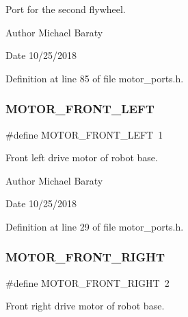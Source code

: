 Port for the second flywheel. 

\begin{DoxyAuthor}{Author}
Michael Baraty 
\end{DoxyAuthor}
\begin{DoxyDate}{Date}
10/25/2018 
\end{DoxyDate}


Definition at line 85 of file motor\+\_\+ports.\+h.

\mbox{\label{motor__ports_8h_a743b47e164fb23b30f4f2f228db0b338}} 
\subsubsection{M\+O\+T\+O\+R\+\_\+\+F\+R\+O\+N\+T\+\_\+\+L\+E\+FT}
{\footnotesize\ttfamily \#define M\+O\+T\+O\+R\+\_\+\+F\+R\+O\+N\+T\+\_\+\+L\+E\+FT~1}



Front left drive motor of robot base. 

\begin{DoxyAuthor}{Author}
Michael Baraty 
\end{DoxyAuthor}
\begin{DoxyDate}{Date}
10/25/2018 
\end{DoxyDate}


Definition at line 29 of file motor\+\_\+ports.\+h.

\mbox{\label{motor__ports_8h_a6f48bcc6d5fce24caeae0b17954c277a}} 
\subsubsection{M\+O\+T\+O\+R\+\_\+\+F\+R\+O\+N\+T\+\_\+\+R\+I\+G\+HT}
{\footnotesize\ttfamily \#define M\+O\+T\+O\+R\+\_\+\+F\+R\+O\+N\+T\+\_\+\+R\+I\+G\+HT~2}



Front right drive motor of robot base. 

